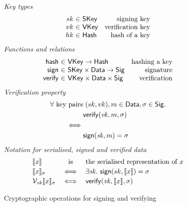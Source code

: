 \documentclass[11pt,a4paper]{article}
\begin{document}
\begin{figure}

\emph{Key types}
%
\begin{equation*}
\begin{array}{r@{~\in~}lr}
  sk
& \type{SKey}
& \text{signing key}
\\
  vk
& \type{VKey}
& \text{verification key}
\\
  hk
& \type{Hash}
& \text{hash of a key}
\end{array}
\end{equation*}
%
\emph{Functions and relations}
%
\begin{equation*}
\begin{array}{r@{~\in~}lr}
  \fun{hash} & \type{VKey} \to \type{Hash}
& \text{hashing a key}
\\
  \fun{sign} & \type{SKey} \times \type{Data} \to \type{Sig}
& \text{signature}
\\
  \fun{verify} & \type{VKey} \times \type{Data} \times \type{Sig}
& \text{verification}
\end{array}
\end{equation*}
%
\emph{Verification property}
%
\begin{align*}
\forall ~ \text{key pairs} & ~ (sk, vk), m \in \mathsf{Data}, \sigma \in \mathsf{Sig}. \\
     & \mathsf{verify} (\mathit{vk}, m, \sigma) \\
\iff & \\
     & \mathsf{sign} (\mathit{sk}, m) = \sigma
\end{align*}
%
\emph{Notation for serialised, signed and verified data}
%
\begin{equation*}
\begin{array}{lcl}
  \llbracket x \rrbracket
& \text{is}
& \text{the serialised representation of } x
\\[0.2em]
  \llbracket x \rrbracket_{\sigma}
& \iff
& \exists \mathit{sk}. ~ \mathsf{sign} (sk, \llbracket x \rrbracket) = \sigma
\\[0.2em]
  \mathcal{V}_{\mathit{vk}}\llbracket x \rrbracket_{\sigma}
& \iff
& \mathsf{verify} (\mathit{vk}, \llbracket x \rrbracket, \sigma)
\end{array}
\end{equation*}

\caption{Cryptographic operations for signing and verifying}
\label{fig:crypto}
\end{figure}
\end{document}
